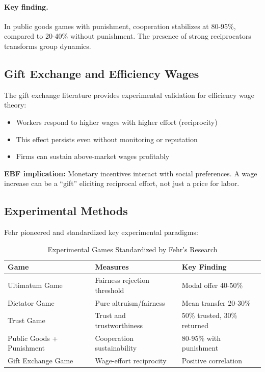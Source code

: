 \paragraph{Key finding.} In public goods games with punishment, cooperation
stabilizes at 80-95\%, compared to 20-40\% without punishment. The presence
of strong reciprocators transforms group dynamics.

\subsection{Gift Exchange and Efficiency Wages}
\label{sec:feh-gift}

The gift exchange literature \citep{fehr1993fairness, fehr1998reciprocity}
provides experimental validation for efficiency wage theory:

\begin{itemize}[nosep]
    \item Workers respond to higher wages with higher effort (reciprocity)
    \item This effect persists even without monitoring or reputation
    \item Firms can sustain above-market wages profitably
\end{itemize}

\textbf{EBF implication:} Monetary incentives interact with social preferences.
A wage increase can be a ``gift'' eliciting reciprocal effort, not just a
price for labor.

\subsection{Experimental Methods}
\label{sec:feh-methods}

Fehr pioneered and standardized key experimental paradigms:

\begin{table}[htbp]
\centering
\caption{Experimental Games Standardized by Fehr's Research}
\label{tab:feh-games}
\begin{tabular}{@{}lll@{}}
\toprule
\textbf{Game} & \textbf{Measures} & \textbf{Key Finding} \\
\midrule
Ultimatum Game & Fairness rejection threshold & Modal offer 40-50\% \\
Dictator Game & Pure altruism/fairness & Mean transfer 20-30\% \\
Trust Game & Trust and trustworthiness & 50\% trusted, 30\% returned \\
Public Goods + Punishment & Cooperation sustainability & 80-95\% with punishment \\
Gift Exchange Game & Wage-effort reciprocity & Positive correlation \\
\bottomrule
\end{tabular}
\end{table}

